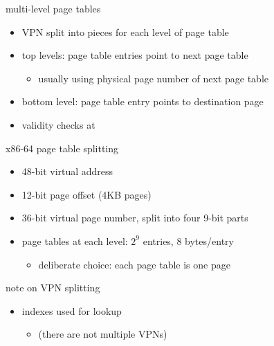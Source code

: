 \begin{frame}{multi-level page tables}
    \begin{itemize}
    \item VPN split into pieces for each level of page table
    \vspace{.5cm}
    \item top levels: page table entries point to next page table
        \begin{itemize}
        \item usually using physical page number of next page table
        \end{itemize}
    \item bottom level: page table entry points to destination page
    \vspace{.5cm}
    \item validity checks at 
    \end{itemize}
\end{frame}

\begin{frame}{x86-64 page table splitting}
    \begin{itemize}
    \item 48-bit virtual address
    \item 12-bit page offset (4KB pages)
    \item 36-bit virtual page number, split into four 9-bit parts
    \item page tables at each level: $2^9$ entries, 8 bytes/entry
        \begin{itemize}
        \item deliberate choice: each page table is one page
        \end{itemize}
    \end{itemize}
\end{frame}

\begin{frame}{note on VPN splitting}
    \begin{itemize}
    \item indexes used for lookup 
        \begin{itemize}
        \item (there are not multiple VPNs)
        \end{itemize}
    \end{itemize}
\end{frame}
